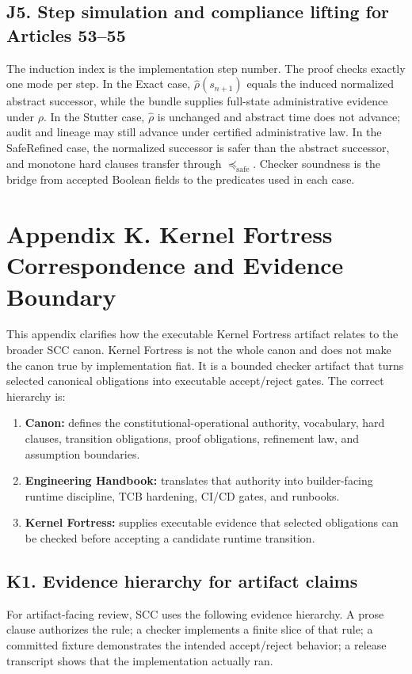 \documentclass[10pt,oneside]{article}
\theoremstyle{definition}
\theoremstyle{remark}
\newcommand{\safe}{\mathrm{safe}}
\begin{document}
\subsection*{J5. Step simulation and compliance lifting for Articles 53--55}
The induction index is the implementation step number. The proof checks exactly one mode per step. In the Exact case, \(\widehat\rho(s_{n+1})\) equals the induced normalized abstract successor, while the bundle supplies full-state administrative evidence under \(\rho\). In the Stutter case, \(\widehat\rho\) is unchanged and abstract time does not advance; audit and lineage may still advance under certified administrative law. In the SafeRefined case, the normalized successor is safer than the abstract successor, and monotone hard clauses transfer through \(\preceq_{\safe}\). Checker soundness is the bridge from accepted Boolean fields to the predicates used in each case.


\section{Appendix K. Kernel Fortress Correspondence and Evidence Boundary}
This appendix clarifies how the executable Kernel Fortress artifact relates to the broader SCC canon. Kernel Fortress is not the whole canon and does not make the canon true by implementation fiat. It is a bounded checker artifact that turns selected canonical obligations into executable accept/reject gates. The correct hierarchy is:
\begin{enumerate}
  \item \textbf{Canon:} defines the constitutional-operational authority, vocabulary, hard clauses, transition obligations, proof obligations, refinement law, and assumption boundaries.
  \item \textbf{Engineering Handbook:} translates that authority into builder-facing runtime discipline, TCB hardening, CI/CD gates, and runbooks.
  \item \textbf{Kernel Fortress:} supplies executable evidence that selected obligations can be checked before accepting a candidate runtime transition.
\end{enumerate}

\subsection*{K1. Evidence hierarchy for artifact claims}
For artifact-facing review, SCC uses the following evidence hierarchy. A prose clause authorizes the rule; a checker implements a finite slice of that rule; a committed fixture demonstrates the intended accept/reject behavior; a release transcript shows that the implementation actually ran.
\end{document}
